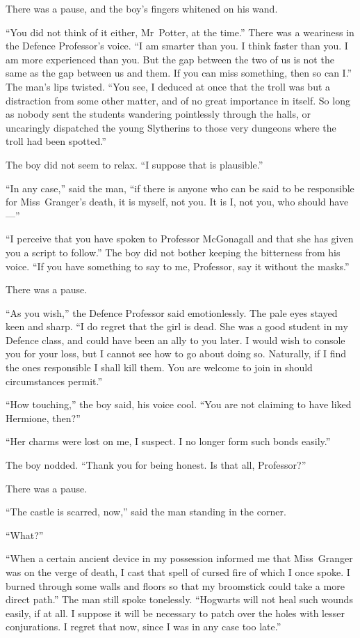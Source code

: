 There was a pause, and the boy’s fingers whitened on his wand.

“You did not think of it either, Mr~Potter, at the time.” There was a weariness in the Defence Professor’s voice.
“I am smarter than you. I think faster than you. I am more experienced than you. But the gap between the two of us is not the same as the gap between us and them. If you can miss something, then so can I.” The man’s lips twisted.
“You see, I deduced at once that the troll was but a distraction from some other matter, and of no great importance in itself. So long as nobody sent the students wandering pointlessly through the halls, or uncaringly dispatched the young Slytherins to those very dungeons where the troll had been spotted.”

The boy did not seem to relax.
“I suppose that is plausible.”

“In any case,” said the man, “if there is anyone who can be said to be responsible for Miss~Granger’s death, it is myself, not you. It is I, not you, who should have—”

“I perceive that you have spoken to Professor McGonagall and that she has given you a script to follow.” The boy did not bother keeping the bitterness from his voice.
“If you have something to say to me, Professor, say it without the masks.”

There was a pause.

“As you wish,” the Defence Professor said emotionlessly. The pale eyes stayed keen and sharp.
“I do regret that the girl is dead. She was a good student in my Defence class, and could have been an ally to you later. I would wish to console you for your loss, but I cannot see how to go about doing so. Naturally, if I find the ones responsible I shall kill them. You are welcome to join in should circumstances permit.”

“How touching,” the boy said, his voice cool.
“You are not claiming to have liked Hermione, then?”

“Her charms were lost on me, I suspect. I no longer form such bonds easily.”

The boy nodded.
“Thank you for being honest. Is that all, Professor?”

There was a pause.

“The castle is scarred, now,” said the man standing in the corner.

“What?”

“When a certain ancient device in my possession informed me that Miss~Granger was on the verge of death, I cast that spell of cursed fire of which I once spoke. I burned through some walls and floors so that my broomstick could take a more direct path.” The man still spoke tonelessly.
“Hogwarts will not heal such wounds easily, if at all. I suppose it will be necessary to patch over the holes with lesser conjurations. I regret that now, since I was in any case too late.”

